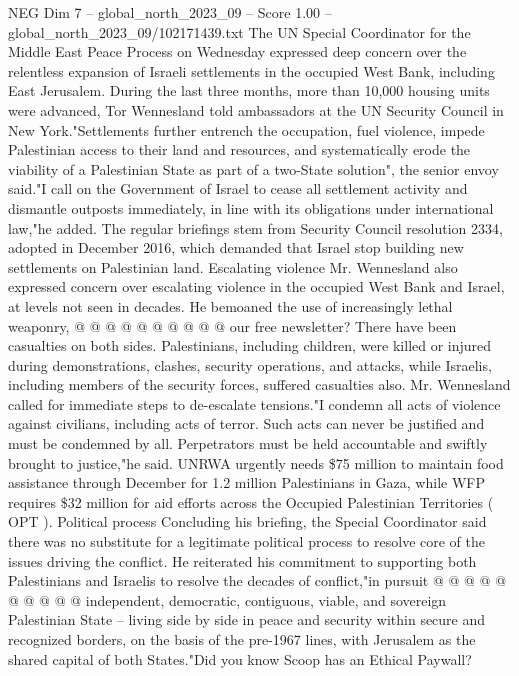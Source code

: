 \begin{textsample}{NEG Dim 7 – global\_north\_2023\_09 – Score 1.00 – global\_north\_2023\_09/102171439.txt}  \label{ex:f7_neg_086}
The UN Special Coordinator for the Middle East Peace Process on Wednesday expressed deep concern over the relentless expansion of Israeli settlements in the occupied West Bank, including East Jerusalem.
During the last three months, more than 10,000 housing units were advanced, Tor Wennesland told ambassadors at the UN Security Council in New York."Settlements further entrench the occupation, fuel violence, impede Palestinian access to their land and resources, and systematically erode the viability of a Palestinian State as part of a two-State solution", the senior envoy said."I call on the Government of Israel to cease all settlement activity and dismantle outposts immediately, in line with its obligations under international law,"he added.
The regular briefings stem from Security Council resolution 2334, adopted in December 2016, which demanded that Israel stop building new settlements on Palestinian land.
Escalating violence Mr.
Wennesland also expressed concern over escalating violence in the occupied West Bank and Israel, at levels not seen in decades.
He bemoaned the use of increasingly lethal weaponry, @ @ @ @ @ @ @ @ @ @ our free newsletter?
There have been casualties on both sides.
Palestinians, including children, were killed or injured during demonstrations, clashes, security operations, and attacks, while Israelis, including members of the security forces, suffered casualties also.
Mr.
Wennesland called for immediate steps to de-escalate tensions."I condemn all acts of violence against civilians, including acts of terror.
Such acts can never be justified and must be condemned by all.
Perpetrators must be held accountable and swiftly brought to justice,"he said.
UNRWA urgently needs \$75 million to maintain food assistance through December for 1.2 million Palestinians in Gaza, while WFP requires \$32 million for aid efforts across the Occupied Palestinian Territories ( OPT ).
Political process Concluding his briefing, the Special Coordinator said there was no substitute for a legitimate political process to resolve core of the issues driving the conflict.
He reiterated his commitment to supporting both Palestinians and Israelis to resolve the decades of conflict,"in pursuit @ @ @ @ @ @ @ @ @ @ independent, democratic, contiguous, viable, and sovereign Palestinian State -- living side by side in peace and security within secure and recognized borders, on the basis of the pre-1967 lines, with Jerusalem as the shared capital of both States."Did you know Scoop has an Ethical Paywall?

\end{textsample}
